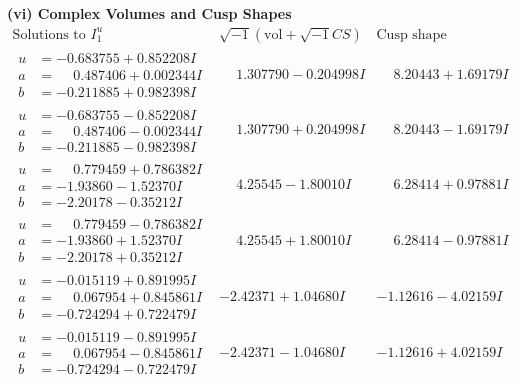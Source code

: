 \documentclass[1p]{elsarticle_modified}
\theoremstyle{definition}
\newcommand{\I}{\sqrt{-1}}
\begin{document}
\newpage\flushleft \textbf{(vi) Complex Volumes and Cusp Shapes}
$$\begin{array}{c|c|c}  
\text{Solutions to }I^u_{1}& \I (\text{vol} + \sqrt{-1}CS) & \text{Cusp shape}\\
 \hline 
\begin{aligned}
u &= -0.683755 + 0.852208 I \\
a &= \phantom{-}0.487406 + 0.002344 I \\
b &= -0.211885 + 0.982398 I\end{aligned}
 & \phantom{-}1.307790 - 0.204998 I & \phantom{-}8.20443 + 1.69179 I \\ \hline\begin{aligned}
u &= -0.683755 - 0.852208 I \\
a &= \phantom{-}0.487406 - 0.002344 I \\
b &= -0.211885 - 0.982398 I\end{aligned}
 & \phantom{-}1.307790 + 0.204998 I & \phantom{-}8.20443 - 1.69179 I \\ \hline\begin{aligned}
u &= \phantom{-}0.779459 + 0.786382 I \\
a &= -1.93860 - 1.52370 I \\
b &= -2.20178 - 0.35212 I\end{aligned}
 & \phantom{-}4.25545 - 1.80010 I & \phantom{-}6.28414 + 0.97881 I \\ \hline\begin{aligned}
u &= \phantom{-}0.779459 - 0.786382 I \\
a &= -1.93860 + 1.52370 I \\
b &= -2.20178 + 0.35212 I\end{aligned}
 & \phantom{-}4.25545 + 1.80010 I & \phantom{-}6.28414 - 0.97881 I \\ \hline\begin{aligned}
u &= -0.015119 + 0.891995 I \\
a &= \phantom{-}0.067954 + 0.845861 I \\
b &= -0.724294 + 0.722479 I\end{aligned}
 & -2.42371 + 1.04680 I & -1.12616 - 4.02159 I \\ \hline\begin{aligned}
u &= -0.015119 - 0.891995 I \\
a &= \phantom{-}0.067954 - 0.845861 I \\
b &= -0.724294 - 0.722479 I\end{aligned}
 & -2.42371 - 1.04680 I & -1.12616 + 4.02159 I \\ \hline\begin{aligned}

\end{aligned}
\end{array}$$
\end{document}
